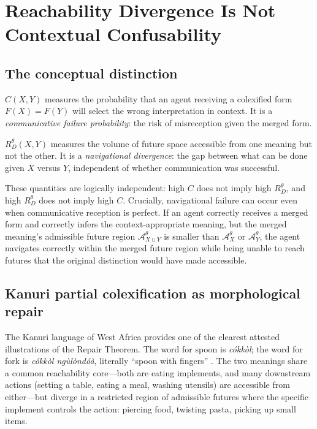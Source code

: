 \documentclass[12pt]{article}
\theoremstyle{rthm}
\theoremstyle{rdef}
\theoremstyle{remark}
\newcommand{\A}{\mathcal{A}}
\newcommand{\RD}[1][\theta]{R_{D}^{#1}}
\begin{document}
\section{Reachability Divergence Is Not Contextual Confusability}
\label{sec:independence}

\subsection{The conceptual distinction}

$C(X,Y)$ measures the probability that an agent receiving a colexified form
$F(X) = F(Y)$ will select the wrong interpretation in context. It is a
\emph{communicative failure probability}: the risk of misreception given the
merged form.

$\RD(X,Y)$ measures the volume of future space accessible from one meaning but
not the other. It is a \emph{navigational divergence}: the gap between what
can be done given $X$ versus $Y$, independent of whether communication was
successful.

These quantities are logically independent: high $C$ does not imply high $\RD$,
and high $\RD$ does not imply high $C$. Crucially, navigational failure can
occur even when communicative reception is perfect. If an agent correctly
receives a merged form and correctly infers the context-appropriate meaning, but
the merged meaning's admissible future region $\A_{X \sqcup Y}^{\theta}$ is
smaller than $\A_X^{\theta}$ or $\A_Y^{\theta}$, the agent navigates correctly
within the merged future region while being unable to reach futures that the
original distinction would have made accessible.

\subsection{Kanuri partial colexification as morphological repair}

The Kanuri language of West Africa provides one of the clearest attested
illustrations of the Repair Theorem. The word for spoon is \textit{c\'{o}kk\`{o}l};
the word for fork is \textit{c\'{o}kk\`{o}l ng\`{u}l\`{o}nd\'{o}\`{a}},
literally ``spoon with fingers'' \cite{beekhuizen2026}. The two meanings share a
common reachability core---both are eating implements, and many downstream
actions (setting a table, eating a meal, washing utensils) are accessible from
either---but diverge in a restricted region of admissible futures where the
specific implement controls the action: piercing food, twisting pasta, picking
up small items.
\end{document}
